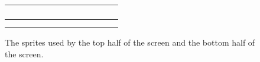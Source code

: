 \begin{figure}[H]
{\begin{adjustbox}{width=14cm,center}
\begin{tabular}{ccccccc}
{\begin{subfigure}{0.3\textwidth}
    \def\MULTICOLORONE{gray}
    \def\MULTICOLORTWO{black}
    \def\SPRITECOLOR{gray}
		
	\end{subfigure}
} &
\makecell[l]{
	\begin{subfigure}{0.3\textwidth}
    \def\MULTICOLORONE{gray}
    \def\MULTICOLORTWO{gray}
    \def\SPRITECOLOR{gray}
		
	\end{subfigure}
} \\ 
        \midrule
\makecell[l]{
	\begin{subfigure}{0.3\textwidth}
    \def\MULTICOLORONE{gray}
    \def\MULTICOLORTWO{white}
    \def\SPRITECOLOR{red}
		
	\end{subfigure}
} & 
\makecell[l]{
	\begin{subfigure}{0.3\textwidth}
    \def\MULTICOLORONE{gray}
    \def\MULTICOLORTWO{white}
    \def\SPRITECOLOR{red}
		
	\end{subfigure}
} & 
\makecell[l]{
	\begin{subfigure}{0.3\textwidth}
    \def\MULTICOLORONE{gray}
    \def\MULTICOLORTWO{white}
    \def\SPRITECOLOR{orange}
		
	\end{subfigure}
} & 
\makecell[l]{
	\begin{subfigure}{0.3\textwidth}
    \def\MULTICOLORONE{gray}
    \def\MULTICOLORTWO{white}
    \def\SPRITECOLOR{yellow}
		
	\end{subfigure}
} & 
\makecell[l]{
	\begin{subfigure}{0.3\textwidth}
    \def\MULTICOLORONE{gray}
    \def\MULTICOLORTWO{white}
    \def\SPRITECOLOR{green}
		
	\end{subfigure}
} & 
\makecell[l]{
	\begin{subfigure}{0.3\textwidth}
    \def\MULTICOLORONE{gray}
    \def\MULTICOLORTWO{white}
    \def\SPRITECOLOR{lightblue}
		
	\end{subfigure}
} & 
\makecell[l]{
	\begin{subfigure}{0.3\textwidth}
    \def\MULTICOLORONE{gray}
    \def\MULTICOLORTWO{white}
    \def\SPRITECOLOR{purple}
		
	\end{subfigure}
} \\ 
        \addlinespace
        \bottomrule
      \end{tabular}
    \end{adjustbox}
  }\caption{The sprites used by the top half of the screen and the bottom half of the screen.}
\end{figure}
